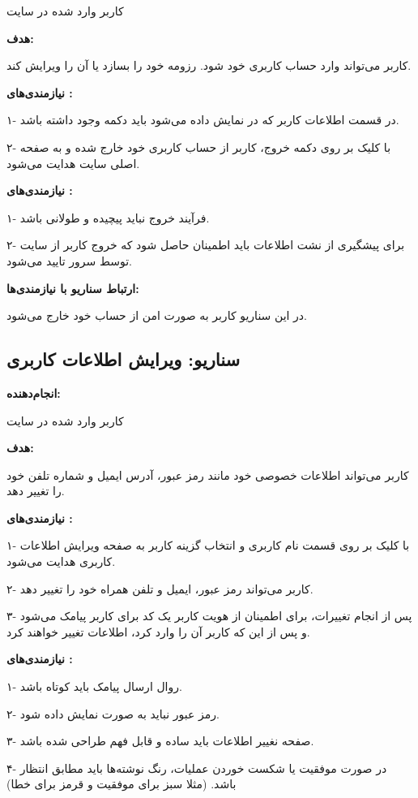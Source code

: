 \documentclass[]{article}
\begin{document}
	کاربر وارد شده در سایت
	
	\textbf{هدف:}
	
	کاربر می‌تواند وارد حساب کاربری خود شود. رزومه خود را بسازد یا آن را ویرایش کند.
	
	\textbf{نیازمندی‌های :} 
	
	۱- در قسمت اطلاعات کاربر که در  نمایش داده می‌شود باید دکمه  وجود داشته باشد.
	
	۲- با کلیک بر روی دکمه خروج، کاربر از حساب کاربری خود خارج شده و به صفحه اصلی سایت هدایت می‌شود.
	
	\textbf{نیازمندی‌های :}
	
	۱- فرآیند خروج نباید پیچیده و طولانی باشد.
	
	۲- برای پیشگیری از نشت اطلاعات باید اطمینان حاصل شود که خروج کاربر از سایت توسط سرور تایید می‌شود.
	
	
	\textbf{ارتباط سناریو با نیازمندی‌ها:}
	
	
	در این سناریو کاربر به صورت امن از حساب خود خارج می‌شود.
	
	\subsection{\LARGE{سناریو: ویرایش اطلاعات کاربری}}
	
	\textbf{انجام‌دهنده:}
	
	کاربر وارد شده در سایت
	
	
	\textbf{هدف:}
	
	کاربر ‌می‌تواند اطلاعات خصوصی خود مانند رمز عبور،‌ آدرس ایمیل و شماره تلفن خود را تغییر دهد.
	
	\textbf{نیازمندی‌های :} 
	
	۱- با کلیک بر روی قسمت نام کاربری و انتخاب گزینه  کاربر به صفحه ویرایش اطلاعات کاربری هدایت می‌شود.
	
	۲- کاربر می‌تواند رمز عبور، ایمیل و تلفن همراه خود را تغییر دهد.
	
	۳- پس از انجام تغییرات، برای اطمینان از هویت کاربر یک کد برای کاربر پیامک می‌شود و پس از این که کاربر آن را وارد کرد، اطلاعات تغییر خواهند کرد.
	
	\textbf{نیازمندی‌های :}
	
	
	۱- روال ارسال پیامک باید کوتاه باشد.
	
	۲- رمز عبور نباید به صورت  نمایش داده شود.
	
	۳- صفحه نغییر اطلاعات باید ساده و قابل فهم طراحی شده باشد.
	
	۴- در صورت موفقیت یا شکست خوردن عملیات، رنگ نوشته‌ها باید مطابق انتظار باشد. (مثلا سبز برای موفقیت و قرمز برای خطا)
	
\end{document}
